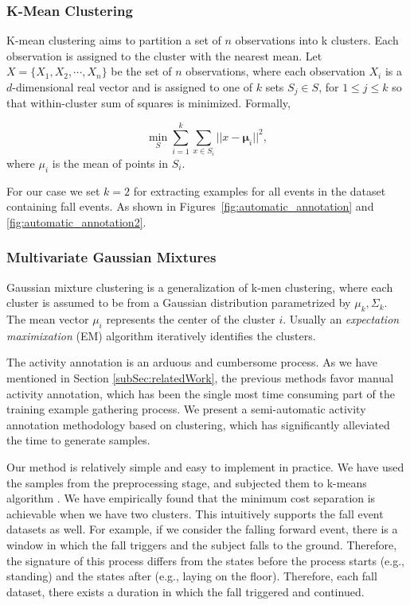 \documentclass{IEEEtran}
\begin{document}
\subsubsection{K-Mean Clustering}
K-mean clustering aims to partition a set of $n$ observations into k clusters. Each observation is assigned to the cluster with the nearest mean. Let  $X = \{X_1, X_2, \cdots, X_n\}$ be the set of $n$ observations, where each observation $X_i$ is a $d$-dimensional real vector and is assigned to one of $k$ sets $S_j \in S$, for $ 1 \leq  j \leq k$ so that within-cluster sum of squares is minimized. Formally,

$$ \min _{S} \sum_{i=1}^{k} \sum_{x \in S_i} || x - \boldsymbol\mu_i ||^2,$$
where $\mu_i$ is the mean of points in $S_i$.

For our case we set $k = 2$ for extracting examples for all events in the dataset containing fall events. As shown in Figures~\ref{fig:automatic_annotation} and \ref{fig:automatic_annotation2}.


\subsubsection{Multivariate Gaussian Mixtures}

Gaussian mixture clustering is a generalization of k-men clustering, where each cluster is assumed to be from a Gaussian distribution parametrized by $\mu_k, \Sigma_k$. The mean vector $\mu_i$ represents the center of the cluster $i$. Usually an \emph{expectation maximixation} (EM) algorithm iteratively identifies the clusters.
 

The activity annotation is an arduous and cumbersome process. As we have mentioned in 
Section \ref{subSec:relatedWork}, the previous methods favor manual activity annotation, 
which has been the single most time consuming part of the training example gathering 
process. We present a semi-automatic activity annotation methodology based on 
clustering, which has 
significantly alleviated the time to generate samples. 

Our method is relatively simple and easy to implement in practice. We have used the 
samples from the preprocessing stage, and subjected them to k-means algorithm 
\cite{Bishop06a}. We have empirically found that the minimum cost separation is 
achievable when we have two clusters. This intuitively supports the fall event datasets 
as well. For 
example, if we consider the falling forward event, there is a window in which the fall 
triggers and the subject falls to the ground. Therefore, the signature of this process 
differs from the states before the process starts (e.g., standing) and the states after 
(e.g., laying on the floor). Therefore, each fall dataset, there exists a duration in 
which the fall triggered and continued.
\end{document}
